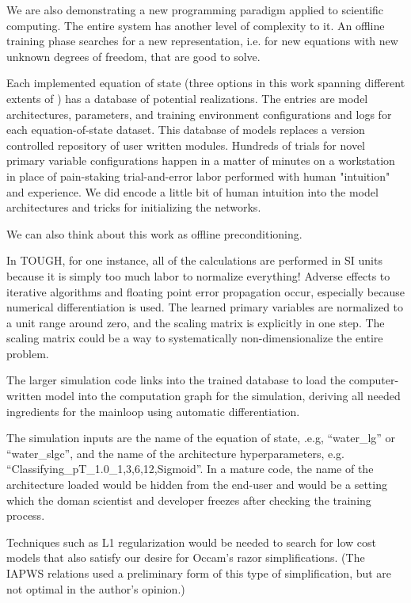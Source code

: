 \documentclass[AMA,STIX1COL]{WileyNJD-v2}
\begin{document}
We are also demonstrating a new programming paradigm applied to
scientific computing. The entire system has another level of complexity
to it. An offline training phase searches for a new representation, i.e.
for new equations with new unknown degrees of freedom, that are good to
solve.

Each implemented equation of state (three options in this work spanning
different extents of ) has a database of potential realizations.
The entries are model architectures, parameters, and training
environment configurations and logs for each equation-of-state dataset.
This database of models replaces a version controlled repository of user
written modules. Hundreds of trials for novel primary variable
configurations happen in a matter of minutes on a workstation in place
of pain-staking trial-and-error labor performed with human "intuition"
and experience. We did encode a little bit of human intuition into the
model architectures and tricks for initializing the networks.

We can also think about this work as offline preconditioning.

In TOUGH, for one instance, all of the calculations are performed in SI units because it is simply too much labor to normalize everything! Adverse effects to iterative algorithms and floating point error propagation occur, especially because numerical differentiation is used.
The learned primary variables are normalized to a unit range around zero, and the scaling matrix is explicitly in one step. The scaling matrix could be a way to systematically non-dimensionalize the entire problem.

The larger simulation code links into the trained database to load the
computer-written model into the computation graph for the simulation,
deriving all needed ingredients for the mainloop using automatic
differentiation.

The simulation inputs are the name of the equation of state, .e.g,
``water\_lg'' or ``water\_slgc'', and the name of the architecture
hyperparameters, e.g. ``Classifying\_pT\_1.0\_1,3,6,12,Sigmoid''.
In a mature code, the name of the architecture loaded would be hidden
from the end-user and would be a setting which the doman scientist and developer freezes
after checking the training process.

Techniques such as L1 regularization would be needed to search for low
cost models that also satisfy our desire for Occam's razor
simplifications. (The IAPWS relations used a preliminary form of this
type of simplification, but are not optimal in the author's opinion.)
\end{document}
